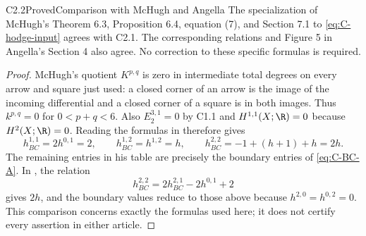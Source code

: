 \begin{claim}{C2.2}{Proved}{Comparison with McHugh and Angella}
The specialization of McHugh's Theorem 6.3, Proposition 6.4, equation
(7), and Section 7.1 to \eqref{eq:C-hodge-input} agrees with C2.1.
The corresponding relations and Figure 5 in Angella's Section 4 also
agree.  No correction to these specific formulas is required.
\end{claim}
\begin{proof}
McHugh's quotient $K^{p,q}$ is zero in intermediate total degrees
on every arrow and square just used: a closed corner of an arrow is
the image of the incoming differential and a closed corner of a square
is in both images.  Thus $k^{p,q}=0$ for $0<p+q<6$.
Also $E_2^{3,1}=0$ by C1.1 and $H^{1,1}(X;\R)=0$ because
$H^2(X;\R)=0$.  Reading the formulas in
\citet[Theorem 6.3, Proposition 6.4, (7), pp. 20--25]{McHugh2018}
therefore gives
\[
h_{BC}^{1,1}=2h^{0,1}=2,\qquad
h_{BC}^{1,2}=h^{1,2}=h,\qquad
h_{BC}^{2,2}=-1+(h+1)+h=2h.
\]
The remaining entries in his table are precisely the boundary entries
of \eqref{eq:C-BC-A}.  In
\citet[Section 4, pp. 13--16]{Angella2018}, the relation
\[
h_{BC}^{2,2}=2h_{BC}^{2,1}-2h^{0,1}+2
\]
gives $2h$, and the boundary values reduce to those above because
$h^{2,0}=h^{0,2}=0$.  This comparison concerns exactly the formulas
used here; it does not certify every assertion in either article.
\end{proof}
